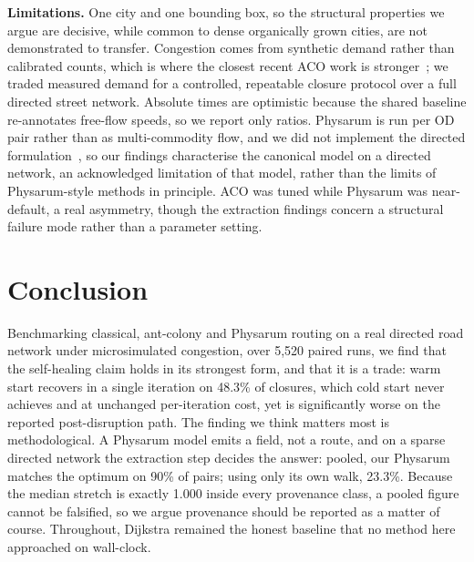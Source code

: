 \textbf{Limitations.} One city and one bounding box, so the structural
properties we argue are decisive, while common to dense organically grown
cities, are not demonstrated to transfer. Congestion comes from synthetic
demand rather than calibrated counts, which is where the closest recent ACO
work is stronger~\cite{tuan2026improved}; we traded measured demand for a
controlled, repeatable closure protocol over a full directed street network.
Absolute times are optimistic because the shared baseline re-annotates
free-flow speeds, so we report only ratios. Physarum is run per OD pair
rather than as multi-commodity flow, and we did not implement the directed
formulation~\cite{zhang2014directed}, so our findings characterise the
canonical model on a directed network, an acknowledged limitation of that
model, rather than the limits of Physarum-style methods in principle. ACO
was tuned while Physarum was near-default, a real asymmetry, though the
extraction findings concern a structural failure mode rather than a
parameter setting.

\section{Conclusion}

Benchmarking classical, ant-colony and Physarum routing on a real directed
road network under microsimulated congestion, over 5{,}520 paired runs, we
find that the self-healing claim holds in its strongest form, and that it is
a trade: warm start recovers in a single iteration on 48.3\% of closures,
which cold start never achieves and at unchanged per-iteration cost, yet is
significantly worse on the reported post-disruption path. The finding we
think matters most is methodological. A Physarum model emits a field, not a
route, and on a sparse directed network the extraction step decides the
answer: pooled, our Physarum matches the optimum on 90\% of pairs; using
only its own walk, 23.3\%. Because the median stretch is exactly 1.000
inside every provenance class, a pooled figure cannot be falsified, so we
argue provenance should be reported as a matter of course. Throughout,
Dijkstra remained the honest baseline that no method here approached on
wall-clock.
